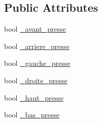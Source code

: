 \subsection*{Public Attributes}
\begin{DoxyCompactItemize}
\item 
bool \hyperlink{class_camera_a4cab15e35a96fdcb2a8599fea13a9b8f}{\+\_\+avant\+\_\+presse}
\item 
bool \hyperlink{class_camera_a0ce12f74953fcd53192e48f8b4164e2e}{\+\_\+arriere\+\_\+presse}
\item 
bool \hyperlink{class_camera_ac2a5c37c4f9603a14e3616d6a75f7998}{\+\_\+gauche\+\_\+presse}
\item 
bool \hyperlink{class_camera_a61b2e438537b99ba1f0a97e5586b7f45}{\+\_\+droite\+\_\+presse}
\item 
bool \hyperlink{class_camera_a43b59b53cb182906d56e6e4d2c31139c}{\+\_\+haut\+\_\+presse}
\item 
bool \hyperlink{class_camera_aaba6828f97c9ef07b6b135a665bd3008}{\+\_\+bas\+\_\+presse}
\end{DoxyCompactItemize}
